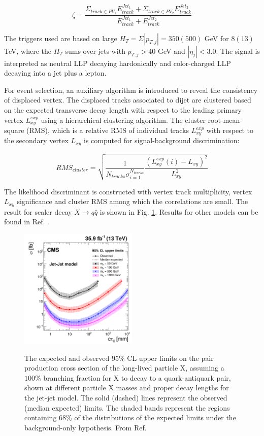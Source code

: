 \begin{equation}
\zeta = \frac{\Sigma_{track\in PV_1}E^{Jet_1}_{track}+\Sigma_{track\in PV_2}E^{Jet_2}_{track}}{E^{Jet_1}_{track}+E^{Jet_2}_{track}}
\end{equation}

The triggers used are based on large $H_T = \Sigma |p_{T,j}| = 350 (500)$ GeV for $8 (13)$ TeV, where the $H_T$ sums over jets with $p_{T,j} > 40$ GeV and $|\eta_j| <  3.0$. The signal is interpreted as neutral LLP decaying hardonically and color-charged LLP decaying into a jet plus a lepton. 

For event selection, an auxiliary algorithm is introduced to reveal the consistency of displaced vertex. The displaced tracks associated to dijet are clustered based on the expected transverse decay length with respect to the leading primary vertex $L_{xy}^{exp}$ using a hierarchical clustering algorithm. The cluster root-mean-square (RMS), which is a relative RMS of individual tracks $L_{xy}^{exp}$ with respect to the secondary vertex $L_{xy} $ is computed for signal-background discrimination:

\begin{equation}
    RMS_{cluster} = \sqrt{\frac{1}{N_{tracks}\sigma^{N_{tracks}}_{i=1}}\frac{(L_{xy}^{exp}(i)-L_{xy})^2}{L^2_{xy}}}
\end{equation}

The likelihood discriminant is constructed with vertex track multiplicity, vertex $L_{xy}$ significance and cluster RMS among which the correlations are small. The result for scaler decay $X \rightarrow q\bar{q}$ is shown in Fig. \ref{fig:CMSjetjet}. Results for other models can be found in Ref. \cite{Sirunyan:2018vlw}.

\begin{figure}
    \centering
    \caption{The expected and observed $95\%$ CL upper limits on the pair production cross section of the long-lived particle X, assuming a $100\%$ branching fraction for X to decay to a quark-antiquark pair, shown at different particle X masses and proper decay lengths for the jet-jet model. The solid (dashed) lines represent the observed (median expected) limits. The shaded bands represent the regions containing $68\%$ of the distributions of the expected limits under the background-only hypothesis. From Ref. \cite{Sirunyan:2018vlw}}
    \includegraphics[width=0.5\textwidth]{fig/CMShardonic.png}
    \label{fig:CMSjetjet}
\end{figure}





